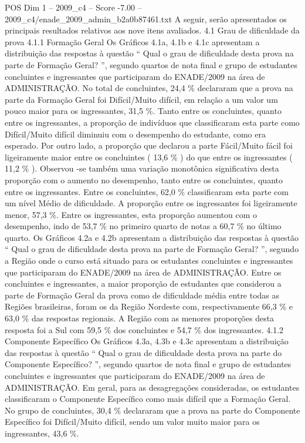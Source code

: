 \begin{textsample}{POS Dim 1 – 2009\_c4 – Score -7.00 – 2009\_c4/enade\_2009\_admin\_b2a0b87461.txt}
A seguir, serão apresentados os principais resultados relativos aos nove itens avaliados. 4.1 Grau de dificuldade da prova 4.1.1 Formação Geral Os Gráficos 4.1a, 4.1b e 4.1c apresentam a distribuição das respostas à questão “ Qual o grau de dificuldade desta prova na parte de Formação Geral? ”, segundo quartos de nota final e grupo de estudantes concluintes e ingressantes que participaram do ENADE/2009 na área de ADMINISTRAÇÃO.
No total de concluintes, 24,4 \% declararam que a prova na parte da Formação Geral foi Difícil/Muito difícil, em relação a um valor um pouco maior para os ingressantes, 31,5 \%.
Tanto entre os concluintes, quanto entre os ingressantes, a proporção de indivíduos que classificaram esta parte como Difícil/Muito difícil diminuiu com o desempenho do estudante, como era esperado.
Por outro lado, a proporção que declarou a parte Fácil/Muito fácil foi ligeiramente maior entre os concluintes ( 13,6 \% ) do que entre os ingressantes ( 11,2 \% ).
Observou -se também uma variação monotônica significativa desta proporção com o aumento no desempenho, tanto entre os concluintes, quanto entre os ingressantes.
Entre os concluintes, 62,0 \% classificaram esta parte com um nível Médio de dificuldade.
A proporção entre os ingressantes foi ligeiramente menor, 57,3 \%.
Entre os ingressantes, esta proporção aumentou com o desempenho, indo de 53,7 \% no primeiro quarto de notas a 60,7 \% no último quarto.
Os Gráficos 4.2a e 4.2b apresentam a distribuição das respostas à questão “ Qual o grau de dificuldade desta prova na parte de Formação Geral? ”, segundo a Região onde o curso está situado para os estudantes concluintes e ingressantes que participaram do ENADE/2009 na área de ADMINISTRAÇÃO.
Entre os concluintes e ingressantes, a maior proporção de estudantes que considerou a parte de Formação Geral da prova como de dificuldade média entre todas as Regiões brasileiras, foram os da Região Nordeste com, respectivamente 66,3 \% e 63,0 \% das respostas regionais.
A Região com as menores proporções desta resposta foi a Sul com 59,5 \% dos concluintes e 54,7 \% dos ingressantes. 4.1.2 Componente Específico Os Gráficos 4.3a, 4.3b e 4.3c apresentam a distribuição das respostas à questão “ Qual o grau de dificuldade desta prova na parte do Componente Específico? ”, segundo quartos de nota final e grupo de estudantes concluintes e ingressantes que participaram do ENADE/2009 na área de ADMINISTRAÇÃO.
Em geral, para as desagregações consideradas, os estudantes classificaram o Componente Específico como mais difícil que a Formação Geral.
No grupo de concluintes, 30,4 \% declararam que a prova na parte do Componente Específico foi Difícil/Muito difícil, sendo um valor muito maior para os ingressantes, 43,6 \%.

\end{textsample}
